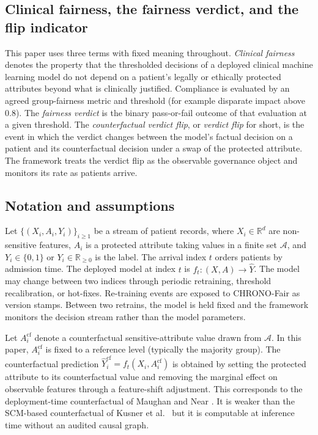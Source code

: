\documentclass[acmsmall,nonacm,review,anonymous]{acmart}
\newcommand{\1}[1]{\mathbf{1}\!\left\{#1\right\}}
\newcommand{\R}{\mathbb{R}}
\begin{document}
\subsection{Clinical fairness, the fairness verdict, and the flip indicator}\label{sec:definitions}

This paper uses three terms with fixed meaning throughout. \emph{Clinical fairness} denotes the property that the thresholded decisions of a deployed clinical machine learning model do not depend on a patient's legally or ethically protected attributes beyond what is clinically justified. Compliance is evaluated by an agreed group-fairness metric and threshold (for example disparate impact above 0.8). The \emph{fairness verdict} is the binary pass-or-fail outcome of that evaluation at a given threshold. The \emph{counterfactual verdict flip}, or \emph{verdict flip} for short, is the event in which the verdict changes between the model's factual decision on a patient and its counterfactual decision under a swap of the protected attribute. The framework treats the verdict flip as the observable governance object and monitors its rate as patients arrive.

\subsection{Notation and assumptions}

Let $\{(X_i, A_i, Y_i)\}_{i \ge 1}$ be a stream of patient records, where $X_i \in \R^d$ are non-sensitive features, $A_i$ is a protected attribute taking values in a finite set $\mathcal{A}$, and $Y_i \in \{0,1\}$ or $Y_i \in \R_{\ge 0}$ is the label. The arrival index $t$ orders patients by admission time. The deployed model at index $t$ is $f_t \colon (X, A) \to \hat{Y}$. The model may change between two indices through periodic retraining, threshold recalibration, or hot-fixes. Re-training events are exposed to CHRONO-Fair as version stamps. Between two retrains, the model is held fixed and the framework monitors the decision stream rather than the model parameters.

Let $A_i^{\mathrm{cf}}$ denote a counterfactual sensitive-attribute value drawn from $\mathcal{A}$. In this paper, $A_i^{\mathrm{cf}}$ is fixed to a reference level (typically the majority group). The counterfactual prediction $\hat{Y}_i^{\mathrm{cf}} = f_t(X_i, A_i^{\mathrm{cf}})$ is obtained by setting the protected attribute to its counterfactual value and removing the marginal effect on observable features through a feature-shift adjustment. This corresponds to the deployment-time counterfactual of Maughan and Near \cite{maughan2022}. It is weaker than the SCM-based counterfactual of Kusner et al.\ \cite{kusner2017} but it is computable at inference time without an audited causal graph.
\end{document}
